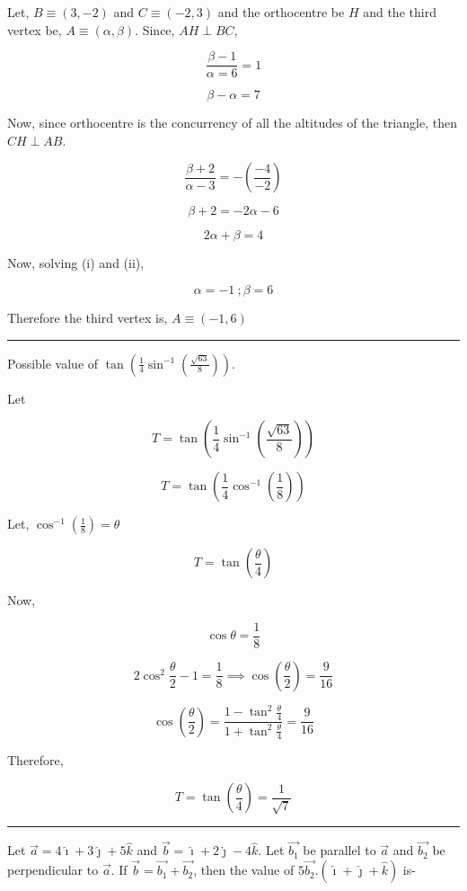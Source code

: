 \documentclass[twocolumn]{article}
\begin{document}
Let, \(B \equiv (3, -2)\) and \(C \equiv (-2, 3)\) and the orthocentre be \(H\) and the third vertex be, \(A \equiv (\alpha , \beta )\). Since, \(AH \perp BC\), 

\[
    \frac{\beta  -1}{\alpha = 6} = 1
\]

\[
    \beta - \alpha = 7 \tag{i}
\]

Now, since orthocentre is the concurrency of all the altitudes of the triangle, then \(CH \perp AB\).

\[
    \frac{\beta +2}{\alpha - 3} = - (\frac{-4}{-2})
\]

\[
    \beta + 2 = -2\alpha - 6
\]

\[
    2\alpha + \beta = 4 \tag{ii}
\]

Now, solving (i) and (ii), 

\[
    \alpha = -1 \ ; \beta = 6
\]

Therefore the third vertex is, \(\boxed{A \equiv (-1, 6)}\) 

\vspace*{0.1in}

\hrule 

\begin{question}
    Possible value of \(\displaystyle \tan (\frac{1}{4}\sin^{-1}(\frac{\sqrt{63}}{8}))\). 
\end{question}

Let 

\[
    T = \tan (\frac{1}{4}\sin^{-1}(\frac{\sqrt{63}}{8}))
\]

\[
    T = \tan (\frac{1}{4} \cos^{-1}(\frac{1}{8}) )
\]

Let, \(\cos^{-1}(\frac{1}{8})= \theta \) 

\[
    T = \tan (\frac{\theta}{4})
\]

Now, 

\[
    \cos \theta = \frac{1}{8}
\]

\[
    2\cos ^{2} \frac{\theta}{2} - 1 = \frac{1}{8} \implies  \cos (\frac{\theta}{2}) = \frac{9}{16} 
\]

\[
    \cos (\frac{\theta}{2}) = \frac{1 - \tan ^{2} \frac{\theta}{4} }{1 + \tan ^{2} \frac{\theta}{4}} = \frac{9}{16}
\]

Therefore, 

\[
    \boxed{T = \tan (\frac{\theta}{4}) = \frac{1}{\sqrt{7} }}
\]

\hrule

\begin{question}
    Let \(\vec{a} = 4\hat{\imath} +  3\hat{\jmath} + 5\hat{k} \) and \(\vec{b} = \hat{\imath} + 2\hat{\jmath} - 4\hat{k} \). Let \(\vec{b_1}\) be parallel to \(\vec{a}\) and \(\vec{b_2}\) be perpendicular to \(\vec{a}\). If \(\vec{b} = \vec{b_1} + \vec{b_2} \), then the value of \(5 \vec{b_2} . (\hat{\imath} + \hat{\jmath} + \hat{k})\) is-     
\end{question}
\end{document}
